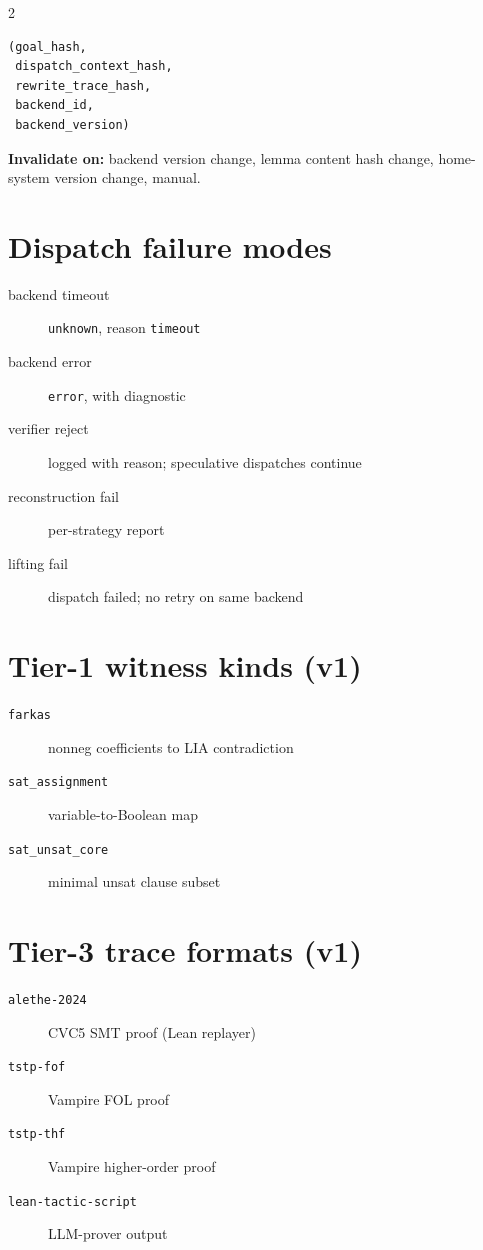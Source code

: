 \documentclass[10pt,letterpaper]{article}
\begin{document}
\begin{multicols}{2}
\begin{lstlisting}[style=plain]
(goal_hash,
 dispatch_context_hash,
 rewrite_trace_hash,
 backend_id,
 backend_version)
\end{lstlisting}

\textbf{Invalidate on:} backend version change, lemma content hash
change, home-system version change, manual.

\section{Dispatch failure modes}

\begin{description}
  \item[backend timeout] \texttt{unknown}, reason \texttt{timeout}
  \item[backend error] \texttt{error}, with diagnostic
  \item[verifier reject] logged with reason; speculative dispatches continue
  \item[reconstruction fail] per-strategy report
  \item[lifting fail] dispatch failed; no retry on same backend
\end{description}

\section{Tier-1 witness kinds (v1)}

\begin{description}
  \item[\texttt{farkas}] nonneg coefficients to LIA contradiction
  \item[\texttt{sat\_assignment}] variable-to-Boolean map
  \item[\texttt{sat\_unsat\_core}] minimal unsat clause subset
\end{description}

\section{Tier-3 trace formats (v1)}

\begin{description}
  \item[\texttt{alethe-2024}] CVC5 SMT proof (Lean replayer)
  \item[\texttt{tstp-fof}] Vampire FOL proof
  \item[\texttt{tstp-thf}] Vampire higher-order proof
  \item[\texttt{lean-tactic-script}] LLM-prover output
\end{description}


\end{multicols}
\end{document}

